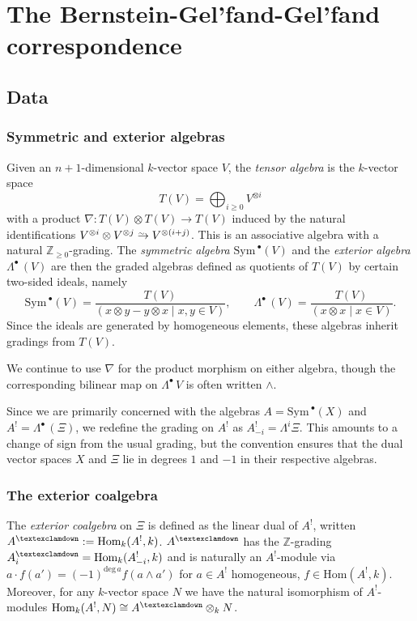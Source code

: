 \documentclass[a4paper]{article}
\theoremstyle{definition}
\theoremstyle{remark}
\newcommand{\simrightarrow}{\mathrel{\ooalign{
     $\to$\cr
     \hidewidth\raise.3em\hbox{$\scaleobj{.7}{\sim}\mkern7mu$}\cr
    }
  }
}
\newcommand{\Sym}{\ensuremath{\text{Sym}\,}}
\newcommand{\exterior}{\ensuremath{\Lambda^\bullet\,}}
\newcommand{\Hom}{\ensuremath{\text{Hom}}}
\newcommand{\gnab}{{\textexclamdown}}
\begin{document}
\section{The Bernstein-Gel'fand-Gel'fand correspondence}\label{sec-BGG}


\subsection{Data}

\subsubsection{Symmetric and exterior algebras}

Given an \(n+1\)-dimensional \(k\)-vector space \(V\),
the \textit{tensor algebra} is the \(k\)-vector space 
\[ T(V) = \bigoplus_{i\geq 0}V^{\otimes i}\] 
with a product \(\nabla: T(V)\otimes T(V) \rightarrow T(V)\) induced by the
natural identifications \(V^{\otimes i}\otimes V^{\otimes j} \simrightarrow
V^{\otimes(i+j)}\). This is an associative algebra with a natural
\(\mathbb{Z}_{\geq 0}\)-grading. The \textit{symmetric algebra}
\(\Sym^\bullet(V)\) and the \textit{exterior algebra} \(\exterior(V)\) are then
the graded algebras defined as quotients of \(T(V)\) by certain two-sided
ideals, namely
\[\Sym^\bullet(V) = \frac{T(V)}{(x\otimes y - y\otimes x \;|\; x,y\in V)},
\qquad \exterior(V) = \frac{T(V)}{(x\otimes x \;|\; x\in V)}.\]
Since the ideals are generated by homogeneous elements, these algebras
inherit gradings from \(T(V)\).

We continue to use \(\nabla\) for the product morphism on either algebra,
though the corresponding bilinear map on \(\exterior{V}\) is often written
\(\wedge\).

Since we are primarily concerned with the algebras \(A=\Sym^\bullet(X)\) and
\(A^!=\exterior(\Xi)\), we redefine the grading on \(A^!\) as
\(A^!_{-i}=\Lambda^i \Xi\). This amounts to a change of sign from the usual
grading, but the convention ensures that the dual vector spaces \(X\) and
\(\Xi\) lie in degrees \(1\) and \(-1\) in their respective algebras.

\subsubsection{The exterior coalgebra}
\label{subsubsec-exteriorcoalgebra}

The \textit{exterior coalgebra} on \(\Xi\) is defined as the linear dual of
\(A^!\), written \(A^\gnab := \Hom_k(A^!, k)\). \(A^\gnab\) has the
\(\mathbb{Z}\)-grading \(A^\gnab_i=\Hom_k(A^!_{-i}, k)\) and is naturally an
\(A^!\)-module via \(a \cdot f(a') = (-1)^{\text{deg}\, a} f(a\wedge a')\) for
\(a\in A^!\) homogeneous, \(f\in \Hom(A^!,k)\). Moreover, for any \(k\)-vector
space \(N\) we have the natural isomorphism of \(A^!\)-modules \(\Hom_{k}(A^!,
N)\cong A^\gnab \otimes_k N\).  
\end{document}
